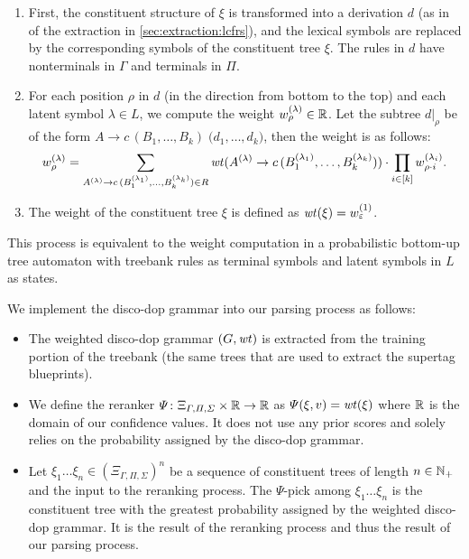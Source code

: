 \documentclass[../../document.tex]{subfiles}
\begin{document}
    \begin{enumerate}
        \item First, the constituent structure of \(\xi\) is transformed into a  derivation \(d\) (as in  of the extraction in \cref{sec:extraction:lcfrs}), and the lexical symbols are replaced by the corresponding  symbols of the constituent tree \(\xi\). The rules in \(d\) have nonterminals in \(\varGamma\) and terminals in \(\varPi\).
        \item For each position \(\rho\) in \(d\) (in the direction from bottom to the top) and each latent symbol \(\lambda \in L\), we compute the weight \(w_\rho^{(\lambda)} \in \mathbb{R}\). Let the subtree \(d|_\rho\) be of the form \(A \to c\,(B_1, \ldots, B_k)\;\big(d_1, \ldots, d_k)\), then the weight is as follows:
            \[
                w_\rho^{(\lambda)} = \sum_{A^{(\lambda)} \to c\,(B_1^{(\lambda_1)}, \ldots, B_k^{(\lambda_k)}) \in R} \mathit{wt}(A^{(\lambda)} \to c\,(B_1^{(\lambda_1)}, \ldots, B_k^{(\lambda_k)})) \cdot \prod_{i \in [k]} w_{\rho\cdot i}^{(\lambda_i)} \text{.}
            \]
        \item The weight of the constituent tree \(\xi\) is defined as \(\mathit{wt}(\xi) = w_\varepsilon^{(1)}\).
    \end{enumerate}
    This process is equivalent to the weight computation in a probabilistic bottom-up tree automaton with treebank  rules as terminal symbols and latent symbols in \(L\) as states.
    
    We implement the disco-dop grammar into our parsing process as follows:
    \begin{itemize}
        \item The weighted disco-dop grammar \((G,\mathit{wt})\) is extracted from the training portion of the treebank (the same trees that are used to extract the supertag blueprints).
        \item We define the reranker \(\varPsi\colon \Xi_{\varGamma, \varPi, \varSigma} \times \mathbb{R} \to \mathbb{R}\) as \(\varPsi(\xi, v) = \mathit{wt}(\xi)\) where \(\mathbb{R}\) is the domain of our confidence values. It does not use any prior scores and solely relies on the probability assigned by the disco-dop grammar.
        \item Let \(\xi_1 \ldots \xi_n \in {(\Xi_{\varGamma, \varPi, \varSigma})}^n\) be a sequence of constituent trees of length \(n\in \mathbb{N}_+\) and the input to the reranking process.
        The \(\varPsi\)-pick among \(\xi_1 \ldots \xi_n\) is the constituent tree with the greatest probability assigned by the weighted disco-dop grammar.
        It is the result of the reranking process and thus the result of our parsing process.
    \end{itemize}
\end{document}
